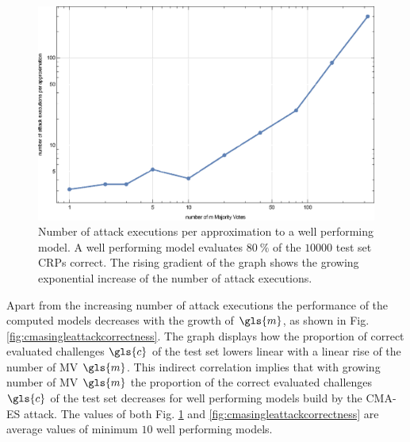 \begin{figure}[ht]
\includegraphics[width=1.00\textwidth]{images/single-mv-classification-cma-attack-correlation.eps}
\caption[Needed \acs{CMA-ES} attack executions for \mpufs]{Number of attack executions per approximation to a well performing model. A well performing model evaluates $80\ \%$ of the $10000$ test set \acp{CRP} correct. The rising gradient of the graph shows the growing exponential increase of the number of attack executions.}
\label{fig:cmasingleattackcorrelation}
\end{figure}

Apart from the increasing number of attack executions the performance of the computed models decreases with the growth of $\gls{m}$, as shown in Fig. \ref{fig:cmasingleattackcorrectness}.
The graph displays how the proportion of correct evaluated challenges $\gls{c}$ of the test set lowers linear with a linear rise of the number of \ac{MV} $\gls{m}$.
This indirect correlation implies that with growing number of \ac{MV} $\gls{m}$ the proportion of the correct evaluated challenges $\gls{c}$ of the test set decreases for well performing models build by the \ac{CMA-ES} attack.
The values of both Fig. \ref{fig:cmasingleattackcorrelation} and \ref{fig:cmasingleattackcorrectness} are average values of minimum $10$ well performing models.

